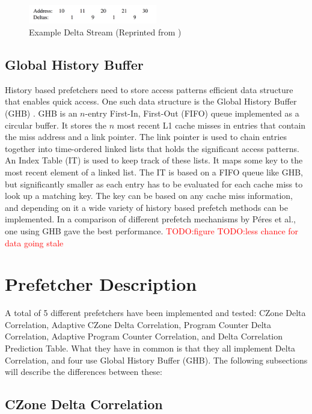 \documentclass[a4paper]{IEEEtran}
\newcommand\TODO[1]{\textcolor{red}{TODO:#1}}
\newcommand\todo[1]{\TODO{#1}}
\begin{document}
\begin{figure}[!ht]
  \centering
      \includegraphics[width=0.5\textwidth]{Figures/DCExample}
  \caption{Example Delta Stream (Reprinted from )}
  \label{fig:delta_stream}
\end{figure}

\subsection{Global History Buffer}

History based prefetchers need to store access patterns efficient data structure that enables quick access.
One such data structure is the Global History Buffer (GHB) \cite{ghb}.
GHB is an $n$-entry First-In, First-Out (FIFO) queue implemented as a circular buffer.
It stores the $n$ most recent L1 cache misses in entries that contain the miss address and a link pointer.
The link pointer is used to chain entries together into time-ordered linked lists that holds the significant access patterns.
An Index Table (IT) is used to keep track of these lists.
It maps some key to the most recent element of a linked list.
The IT is based on a FIFO queue like GHB, but significantly smaller as each entry has to be evaluated for each cache miss to look up a matching key.
The key can be based on any cache miss information, and depending on it a wide variety of history based prefetch methods can be implemented.
In a comparison of different prefetch mechanisms by Péres et al.\cite{microlib}, one using GHB gave the best performance.
\todo{figure}
\todo{less chance for data going stale}

\section{Prefetcher Description}
A total of 5 different prefetchers have been implemented and tested: CZone Delta Correlation, Adaptive CZone Delta Correlation, Program Counter Delta Correlation, Adaptive Program Counter Correlation, and Delta Correlation Prediction Table. 
What they have in common is that they all implement Delta Correlation, and four use Global History Buffer (GHB). 
The following subsections will describe the differences between these:
\subsection{CZone Delta Correlation}
\end{document}
